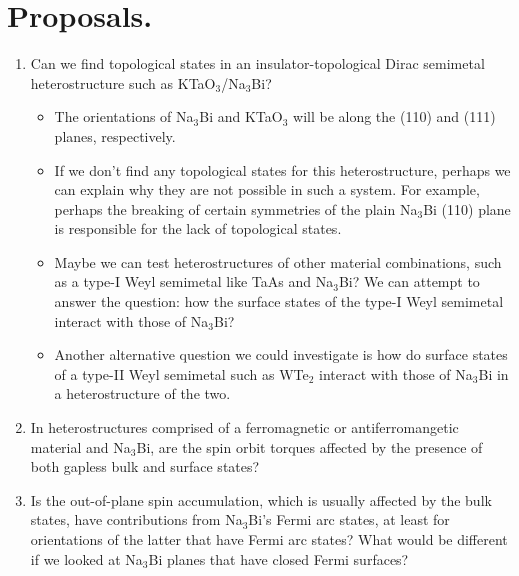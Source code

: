 \documentclass[english]{revtex4-1}
\begin{document}
\section{Proposals.}

\begin{enumerate}
    
    \item Can we find topological states in an insulator-topological Dirac semimetal heterostructure such as KTaO$_3$/Na$_3$Bi?  
    
    \begin{itemize}
        \item The orientations of Na$_3$Bi and KTaO$_3$ will be along the (110) and (111) planes, respectively.
        
        \item If we don't find any topological states for this heterostructure, perhaps we can explain why they are not possible in such a system.  For example, perhaps the breaking of certain symmetries of the plain Na$_3$Bi (110) plane is responsible for the lack of topological states.
        
        \item Maybe we can test heterostructures of other material combinations, such as a type-I Weyl semimetal like TaAs and Na$_3$Bi?  We can attempt to answer the question: how the surface states of the type-I Weyl semimetal interact with those of Na$_3$Bi?
        
        \item  Another alternative question we could investigate is how do surface states of a type-II Weyl semimetal such as WTe$_2$ interact with those of Na$_3$Bi in a heterostructure of the two.
    \end{itemize}
    
    \item In heterostructures comprised of a ferromagnetic or antiferromangetic material and Na$_3$Bi, are the spin orbit torques affected by the presence of both gapless bulk and surface states?
    
    \item Is the out-of-plane spin accumulation, which is usually affected by the bulk states, have contributions from Na$_3$Bi's  Fermi arc states, at least for orientations of the latter that have Fermi arc states?  What would be different if we looked at Na$_3$Bi planes that have closed Fermi surfaces?
    
\end{enumerate}


\medskip

\printbibliography
\end{document}
